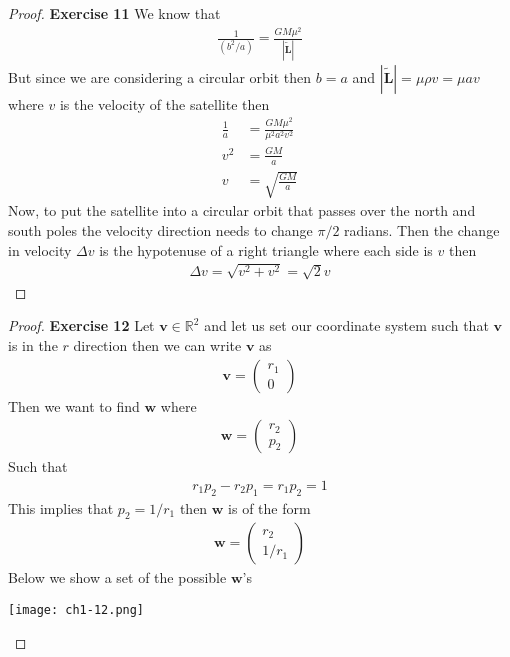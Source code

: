 \documentclass[11pt]{article}
\newcommand{\R}{\mathbb{R}}
\theoremstyle{definition}
\begin{document}
\cleardoublepage
\begin{proof}{\textbf{Exercise 11}}
    We know that
    \begin{align*}
        \frac{1}{(b^2/a)} = \frac{GM\mu^2}{|\tilde{\bm{L}}|}
    \end{align*}
    But since we are considering a circular orbit then $b=a$ and 
    $|\tilde{\bm{L}}| = \mu\rho v= \mu a v$ where $v$ is the velocity of
    the satellite then
    \begin{align*}
        \frac{1}{a} &= \frac{GM\mu^2}{\mu^2 a^2 v^2}\\
        v^2 &= \frac{GM}{a}\\
        v &= \sqrt{\frac{GM}{a}}
    \end{align*}
    Now, to put the satellite into a circular orbit that passes over the north
    and south poles the velocity direction needs to change $\pi/2$ radians.
    Then the change in velocity $\Delta v$ is the hypotenuse of a right triangle
    where each side is $v$ then
    \begin{align*}
        \Delta v = \sqrt{v^2 + v^2} = \sqrt{2}v
    \end{align*}
\end{proof}
\cleardoublepage
\begin{proof}{\textbf{Exercise 12}}
    Let $\bm{v} \in \R^2$ and let us set our coordinate system such that
    $\bm{v}$ is in the $r$ direction then we can write $\bm{v}$ as
    \begin{align*}
        \bm{v} = \begin{pmatrix} r_1\\ 0 \end{pmatrix}
    \end{align*}
    Then we want to find $\bm{w}$ where 
    \begin{align*}
        \bm{w} = \begin{pmatrix} r_2\\ p_2 \end{pmatrix}
    \end{align*}
    Such that
    \begin{align*}
        r_1p_2 - r_2p_1 = r_1p_2 = 1
    \end{align*}
    This implies that $p_2 = 1/r_1$ then $\bm{w}$ is of the form
    \begin{align*}
        \bm{w} = \begin{pmatrix} r_2\\ 1/r_1 \end{pmatrix}
    \end{align*}
    Below we show a set of the possible $\bm{w}$'s
    \begin{center}
        \texttt{[image: ch1-12.png]}
    \end{center}
\end{proof}
\end{document}
